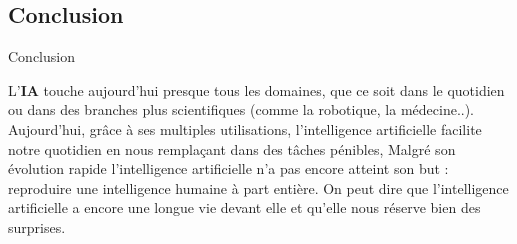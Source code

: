 \subsection{Conclusion}

\begin{frame}{Conclusion}
    \begin{enumerate}[<+-|alert@+>]
        \myitem
            L'\textbf{IA} touche aujourd'hui presque tous les domaines, que ce soit dans le
            quotidien ou dans des branches plus
            scientifiques (comme la robotique, la médecine..).
        \myitem
            Aujourd'hui, grâce à ses multiples utilisations, l'intelligence artificielle
            facilite notre quotidien en nous remplaçant dans des tâches pénibles,
        \myitem
            Malgré son évolution rapide l'intelligence artificielle n'a pas
            encore atteint son but : reproduire une intelligence humaine à part
            entière. On peut dire que l'intelligence artificielle a encore une
            longue vie devant elle et qu'elle nous réserve bien des surprises.\mybox

    \end{enumerate}
\end{frame}


